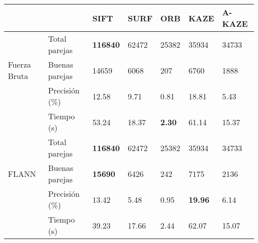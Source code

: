 \begin{table}[h]
	\centering
	\label{0752}
	\renewcommand{\arraystretch}{0.8}%
	\begin{tabular}{@{}lllllll@{}}
		\toprule
		&                      				& SIFT 			& SURF & ORB & KAZE & A-KAZE  \\ \midrule 
		\hfill\vline& Total parejas  &\textbf{116840}& 62472&25382&35934 & 34733   \\
		Fuerza Bruta \vline& Buenas parejas & 14659			& 6068 & 207 & 6760 & 1888    \\
		\hfill\vline& Precisión (\%) & 12.58			&9.71  &0.81 & 18.81 & 5.43  \\
		\vspace{0.3cm}
		\hfill\vline& Tiempo (s)     & 53.24			&18.37 & \textbf{2.30} &61.14 & 15.37   \\
		
		\hfill\vline& Total parejas  &\textbf{116840}& 62472&25382			&35934 				& 34733   \\
		FLANN  \hfill\vline& Buenas parejas &\textbf{15690} & 6426 & 242 			& 7175 				& 2136    \\
		\hfill\vline& Precisión (\%) & 13.42			& 5.48 &0.95  			& \textbf{19.96} 	& 6.14    \\ 
		\hfill\vline& Tiempo (s)     & 39.23			& 17.66& 2.44	& 62.07				& 15.07   \\ 
		\bottomrule
	\end{tabular}
\end{table}

